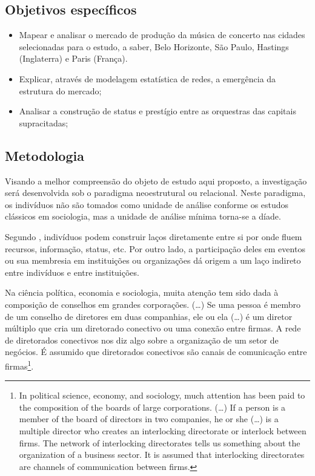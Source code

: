 \documentclass[a4paper, 12pt, openright, oneside, german, french, english, brazil]{abntex2}
\begin{document}
	\subsection*{Objetivos específicos}
	
	\begin{itemize}
		\item Mapear e analisar o mercado de produção da música de concerto nas cidades selecionadas para o estudo, a saber, Belo Horizonte, São Paulo, Hastings (Inglaterra) e Paris (França).
		\item Explicar, através de modelagem estatística de redes, a emergência da estrutura do mercado;
		\item Analisar a construção de status e prestígio entre as orquestras das capitais supracitadas;
	\end{itemize}
	
	\subsection*{Metodologia}
	
	Visando a melhor compreensão do objeto de estudo aqui proposto, a investigação será desenvolvida sob o paradigma neoestrutural ou relacional. Neste paradigma, os indivíduos não são tomados como unidade de análise conforme os estudos clássicos em sociologia, mas a unidade de análise mínima torna-se a díade.
	
	Segundo , indivíduos podem construir laços diretamente entre si por onde fluem recursos, informação, status, etc. Por outro lado, a participação deles em eventos ou sua membresia em instituições ou organizações dá origem a um laço indireto entre indivíduos e entre instituições.
	
	\begin{citacao}
		Na ciência política, economia e sociologia, muita atenção tem sido dada à composição de conselhos em grandes corporações. (\dots) Se uma pessoa é membro de um conselho de diretores em duas companhias, ele ou ela (\dots) é um diretor múltiplo que cria um diretorado conectivo ou uma conexão entre firmas. A rede de diretorados conectivos nos diz algo sobre a organização de um setor de negócios. É assumido que diretorados conectivos são canais de comunicação entre firmas\footnote{In political science, economy, and sociology, much attention has been paid to the composition of the boards of large corporations. (\dots) If a person is a member of the board of directors in two companies, he or she (\dots) is a multiple director who creates an interlocking directorate or interlock between firms. The network of interlocking directorates tells us something about the organization of a business sector. It is assumed that interlocking directorates are channels of communication between firms.}. \cite[p. 117]{denooy2011exploratory}
	\end{citacao}
	
\end{document}
